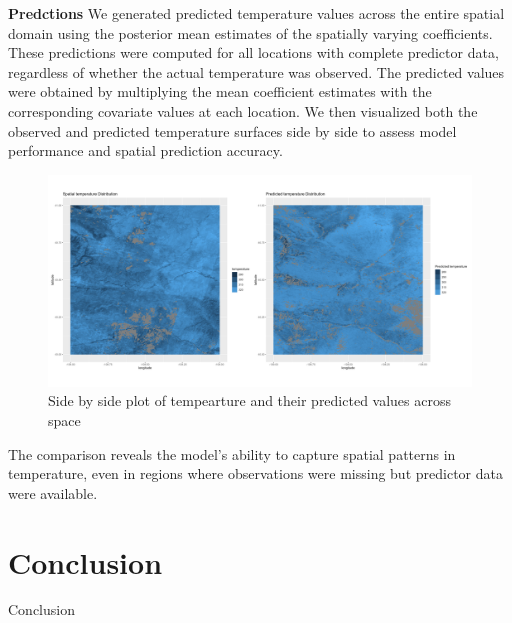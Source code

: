  
 \textbf{Predctions} \newline
 We generated predicted temperature values across the entire spatial domain using the posterior mean estimates of the spatially varying coefficients. 
 These predictions were computed for all locations with complete predictor data, regardless of whether the actual temperature was observed. 
 The predicted values were obtained by multiplying the mean coefficient estimates with the corresponding covariate values at each location. 
 We then visualized both the observed and predicted temperature surfaces side by side to assess model performance and spatial prediction accuracy. 
 
 
 \begin{figure}[ht]
 \centering
 \includegraphics[width=\textwidth]{../../figures/predictions.png}
 \caption{Side by side plot of tempearture and their predicted values across space}
 \label{fig:predicted temperature}
 \end{figure}
 
 The comparison reveals the model’s ability to capture spatial patterns in temperature, even in regions where observations were missing but predictor data were available.
 
 
\section{Conclusion}
Conclusion 






